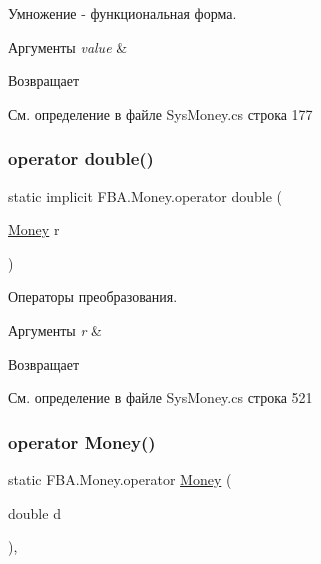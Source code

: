 Умножение -\/ функциональная форма. ~\newline



\begin{DoxyParams}{Аргументы}
{\em value} & \\
\hline
\end{DoxyParams}
\begin{DoxyReturn}{Возвращает}

\end{DoxyReturn}


См. определение в файле Sys\+Money.\+cs строка 177

\mbox{\label{struct_f_b_a_1_1_money_a16581c897a0893a484d72900da5615f0}} 
\subsubsection{\texorpdfstring{operator double()}{operator double()}}
{\footnotesize\ttfamily static implicit F\+B\+A.\+Money.\+operator double (\begin{DoxyParamCaption}\item[{\mbox{\hyperlink{struct_f_b_a_1_1_money}{Money}}}]{r }\end{DoxyParamCaption})\hspace{0.3cm}{\ttfamily [static]}}



Операторы преобразования. 


\begin{DoxyParams}{Аргументы}
{\em r} & \\
\hline
\end{DoxyParams}
\begin{DoxyReturn}{Возвращает}

\end{DoxyReturn}


См. определение в файле Sys\+Money.\+cs строка 521

\mbox{\label{struct_f_b_a_1_1_money_ae8e50658dc1328bb0d3ff8c127c3feb0}} 
\subsubsection{\texorpdfstring{operator Money()}{operator Money()}}
{\footnotesize\ttfamily static F\+B\+A.\+Money.\+operator \mbox{\hyperlink{struct_f_b_a_1_1_money}{Money}} (\begin{DoxyParamCaption}\item[{double}]{d }\end{DoxyParamCaption})\hspace{0.3cm}{\ttfamily [explicit]}, {\ttfamily [static]}}




